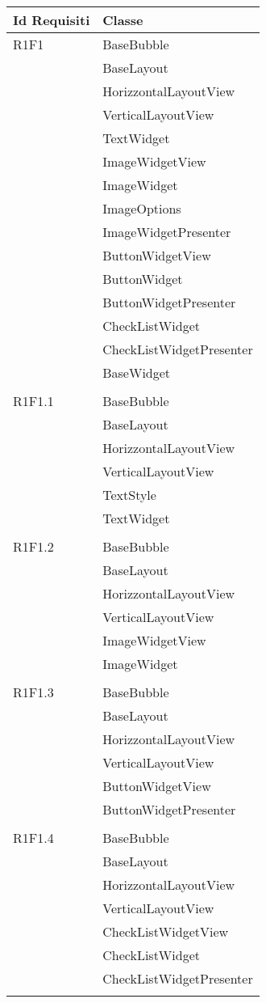 \begin{center}
	\begin{longtable}{|p{7cm}|p{5cm}|}\hline
		Id Requisiti & Classe \\ \hline
		R1F1 & BaseBubble \\ & BaseLayout \\ & HorizzontalLayoutView \\ & VerticalLayoutView \\ & TextWidget \\ & ImageWidgetView \\ & ImageWidget \\ & ImageOptions \\ & ImageWidgetPresenter \\ & ButtonWidgetView \\ & ButtonWidget \\ & ButtonWidgetPresenter \\ & CheckListWidget \\ & CheckListWidgetPresenter \\ & BaseWidget \\ & \\ \hline
		R1F1.1 & BaseBubble \\ & BaseLayout \\ & HorizzontalLayoutView \\ & VerticalLayoutView \\ & TextStyle \\ & TextWidget \\ & \\ \hline
		R1F1.2 & BaseBubble \\ & BaseLayout \\ & HorizzontalLayoutView \\ & VerticalLayoutView \\ & ImageWidgetView \\ & ImageWidget \\ & \\ \hline
		R1F1.3 & BaseBubble \\ & BaseLayout \\ & HorizzontalLayoutView \\ & VerticalLayoutView \\ & ButtonWidgetView \\ & ButtonWidgetPresenter \\ & \\ \hline
		R1F1.4 & BaseBubble \\ & BaseLayout \\ & HorizzontalLayoutView \\ & VerticalLayoutView \\ & CheckListWidgetView \\ & CheckListWidget \\ & CheckListWidgetPresenter \\ & \\ \hline

\end{longtable}
\end{center}
